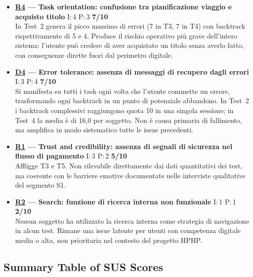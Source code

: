 \documentclass[11pt,a4paper]{article}
\begin{document}
\begin{tcolorbox}[colback=backgroundColor,colframe=borderColor,arc=2mm]
\begin{itemize}[leftmargin=*,itemsep=8pt]
    \item \textbf{\hyperref[iss:R4]{R4} --- Task orientation: 
    confusione tra pianificazione viaggio e acquisto titolo}
    \hfill I:\,4 \textbar{} P:\,3 \textbar{} \textbf{7/10}\\
    In Test~2 genera il picco massimo di errori 
    (7 in T3, 7 in T4) con backtrack rispettivamente di 5 e 4. 
    Produce il rischio operativo più grave dell'intero sistema: 
    l'utente può credere di aver acquistato un titolo senza averlo 
    fatto, con conseguenze dirette fuori dal perimetro digitale.

    \item \textbf{\hyperref[iss:D4]{D4} --- Error tolerance: 
    assenza di messaggi di recupero dagli errori}
    \hfill I:\,3 \textbar{} P:\,4 \textbar{} \textbf{7/10}\\
    Si manifesta su tutti i task ogni volta che l'utente commette un 
    errore, trasformando ogni backtrack in un punto di potenziale 
    abbandono. In Test~2 i backtrack complessivi raggiungono quota 10 
    in una singola sessione; in Test~4 la media è di 16,0 per soggetto. 
    Non è causa primaria di fallimento, ma amplifica in modo sistematico 
    tutte le issue precedenti.

    \item \textbf{\hyperref[iss:R1]{R1} --- Trust and credibility: 
    assenza di segnali di sicurezza nel flusso di pagamento}
    \hfill I:\,3 \textbar{} P:\,2 \textbar{} \textbf{5/10}\\
    Affligge T3 e T5. Non rilevabile direttamente dai dati quantitativi 
    dei test, ma coerente con le barriere emotive documentate nelle 
    interviste qualitative del segmento S1.

    \item \textbf{\hyperref[iss:R2]{R2} --- Search: 
    funzione di ricerca interna non funzionale}
    \hfill I:\,1 \textbar{} P:\,1 \textbar{} \textbf{2/10}\\
    Nessun soggetto ha utilizzato la ricerca interna come strategia 
    di navigazione in alcun test. Rimane una issue latente per utenti 
    con competenza digitale media o alta, non prioritaria nel contesto 
    del progetto HPHP.

\end{itemize}
\end{tcolorbox}

\vspace{1cm}

\subsection*{Summary Table of SUS Scores}
\end{document}
